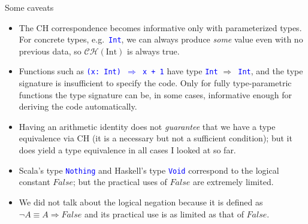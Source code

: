 \documentclass[english]{beamer}
\begin{document}
\begin{frame}{Some caveats}

\begin{itemize}
\item The CH correspondence becomes informative only with parameterized
types. For concrete types, e.g.\ \texttt{\textcolor{blue}{\footnotesize{}Int}},
we can always produce \emph{some} value even with no previous data,
so $\mathcal{CH}(\text{Int})$ is always true.
\item Functions such as \texttt{\textcolor{blue}{\footnotesize{}(x:\ Int)
$\Rightarrow$ x + 1}} have type \texttt{\textcolor{blue}{\footnotesize{}Int}}
$\Rightarrow$\texttt{\textcolor{blue}{\footnotesize{} Int}}, and
the type signature is insufficient to specify the code. Only for fully
type-parametric functions the type signature can be, in some cases,
informative enough for deriving the code automatically.
\item Having an arithmetic identity does not \emph{guarantee} that we have
a type equivalence via CH (it is a necessary but not a sufficient
condition); but it does yield a type equivalence in all cases I looked
at so far.
\item Scala's type \texttt{\textcolor{blue}{\footnotesize{}Nothing}} and
Haskell's type \texttt{\textcolor{blue}{\footnotesize{}Void}} correspond
to the logical constant $False$; but the practical uses of $False$
are extremely limited. 
\item We did not talk about the logical negation because it is defined as
$\neg A\equiv A\Rightarrow False$ and its practical use is as limited
as that of $False$.
\end{itemize}
\end{frame}
\end{document}

